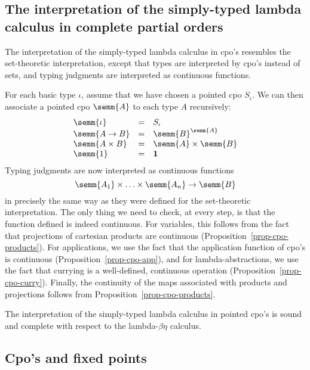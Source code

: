 \documentclass[12pt]{article}
\begin{document}
\subsection{The interpretation of the simply-typed lambda calculus in
  complete partial orders}\label{subsec-cpo-interp}

The interpretation of the simply-typed lambda calculus in cpo's
resembles the set-theoretic interpretation, except that types are
interpreted by cpo's instead of sets, and typing judgments are
interpreted as continuous functions.

For each basic type $\iota$, assume that we have chosen a pointed cpo
$S_{\iota}$. We can then associate a pointed cpo $\semm{A}$ to each
type $A$ recursively:
\[ \begin{array}{lll}
  \semm{\iota} &=& S_{\iota} \\
  \semm{A\to B} &=& \semm{B}^{\semm{A}} \\
  \semm{A\times B} &=& \semm{A}\times\semm{B} \\
  \semm{1} &=& {\bf 1}
\end{array}
\]
Typing judgments are now interpreted as continuous functions
\[     \semm{A_1}\times\ldots\times\semm{A_n} \to \semm{B}
\]
in precisely the same way as they were defined for the set-theoretic
interpretation. The only thing we need to check, at every step, is
that the function defined is indeed continuous. For variables, this
follows from the fact that projections of cartesian products are
continuous (Proposition~\ref{prop-cpo-products}). For applications, we
use the fact that the application function of cpo's is continuous
(Proposition~\ref{prop-cpo-app}), and for lambda-abstractions, we use
the fact that currying is a well-defined, continuous operation
(Proposition~\ref{prop-cpo-curry}). Finally, the continuity of the
maps associated with products and projections follows from
Proposition~\ref{prop-cpo-products}.

\begin{proposition}
  The interpretation of the simply-typed lambda calculus in pointed
  cpo's is sound and complete with respect to the lambda-$\beta\eta$
  calculus.
\end{proposition}

\subsection{Cpo's and fixed points}
\end{document}
